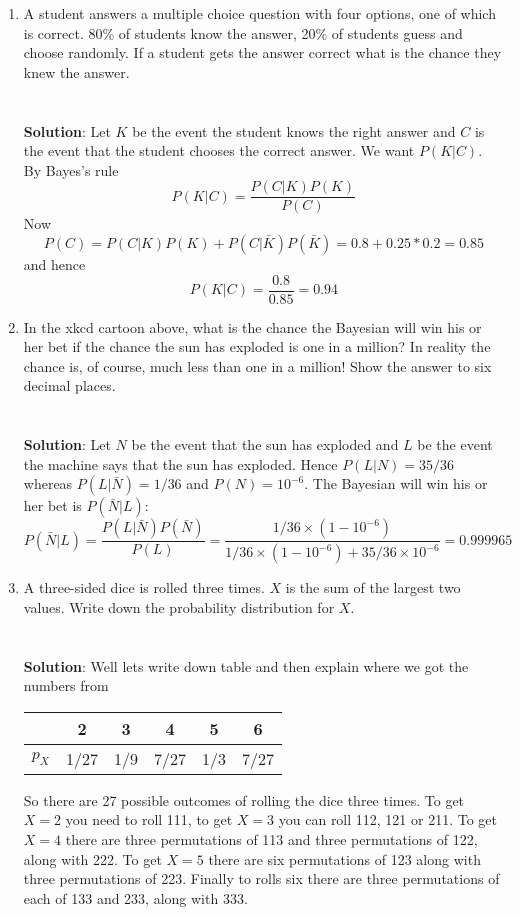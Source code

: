 \documentclass[11pt,a4paper]{scrartcl}
\begin{document}
\begin{enumerate}
\item A student answers a multiple choice question with four options,
  one of which is correct. 80\% of students know the answer, 20\% of
  students guess and choose randomly. If a student gets the answer
  correct what is the chance they knew the
  answer.\\ \\ \\ \textbf{Solution}: Let $K$ be the event the student
  knows the right answer and $C$ is the event that the student chooses
  the correct answer. We want $P(K|C)$. By Bayes's rule
\begin{equation}
P(K|C)=\frac{P(C|K)P(K)}{P(C)}
\end{equation}
Now
\begin{equation}
  P(C)=P(C|K)P(K)+P(C|\bar{K})P(\bar{K})=0.8+0.25*0.2=0.85
\end{equation}
and hence
\begin{equation}
P(K|C)=\frac{0.8}{0.85}=0.94
\end{equation}

\item In the xkcd cartoon above, what is the chance the Bayesian will
  win his or her bet if the chance the sun has exploded is one in a
  million? In reality the chance is, of course, much less than one in
  a million! Show the answer to six decimal places.\\ \\ \\ \textbf{Solution}: Let $N$ be the event that the sun has exploded
  and $L$ be the event the machine says that the sun has
  exploded. Hence $P(L|N)=35/36$ whereas $P(L|\bar{N})=1/36$ and $P(N)=10^{-6}$. The Bayesian will
  win his or her bet is $P(\bar{N}|L)$:
\begin{equation}
P(\bar{N}|L)=\frac{P(L|\bar{N})P(\bar{N})}{P(L)}=\frac{1/36\times (1-10^{-6})}{1/36\times (1-10^{-6})+35/36\times 10^{-6}}=0.999965
\end{equation}

\item A three-sided dice is rolled three times. $X$ is the sum of the
  largest two values. Write down the probability distribution for
  $X$.\\ \\ \\ \textbf{Solution}: Well lets write down table and then
  explain where we got the numbers from
\begin{center}
\begin{tabular}{c|ccccc}
&2&3&4&5&6\\
\hline
$p_X$&1/27&1/9&7/27&1/3&7/27
\end{tabular}
\end{center}
So there are 27 possible outcomes of rolling the dice three times. To
get $X=2$ you need to roll 111, to get $X=3$ you can roll 112, 121 or
211. To get $X=4$ there are three permutations of 113 and three
permutations of 122, along with 222. To get $X=5$ there are six
permutations of 123 along with three permutations of 223. Finally to
rolls six there are three permutations of each of 133 and 233, along
with 333.

\end{enumerate}
\end{document}
